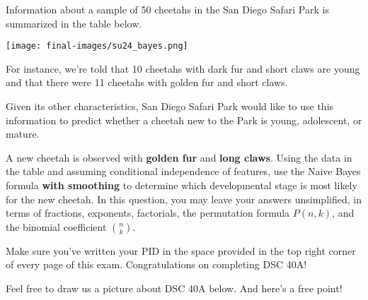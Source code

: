 \documentclass[twoside,12pt]{article}
\begin{document}
\begin{probset}
\begin{prob}[(6 pts)]
\end{prob}

\newpage \begin{prob}[(6 pts)]

Information about a sample of 50 cheetahs in the San Diego Safari Park is summarized in the table below.

    \begin{center}
        \texttt{[image: final-images/su24\_bayes.png]}
    \end{center}

For instance, we're told that 10 cheetahs with dark fur and short claws are young and that there were 11 cheetahs with golden fur and short claws.

Given its other characteristics, San Diego Safari Park would like to use this information to predict whether a cheetah new to the Park is young, adolescent, or mature.

\bigskip


A new cheetah is observed with \textbf{golden fur} and \textbf{long claws}. Using the data in the table and assuming conditional independence of features, use the Naive Bayes formula \textbf{with smoothing} to determine which developmental stage is most likely for the new cheetah. In this question, you may leave your answers unsimplified, in terms of fractions, exponents, factorials, the permutation formula $P(n, k)$, and the binomial coefficient ${n \choose k}$.


 \begin{responsebox}{3.3in}
            
\end{responsebox}
    
    
\end{prob}

\newpage

Make sure you've written your PID in the space provided in the top right corner of every page of this exam. Congratulations on completing DSC 40A!

Feel free to draw us a picture about DSC 40A below. And here's a free point!

\begin{responsebox}{7.5in}
    
\end{responsebox}

\end{probset}
\end{document}
